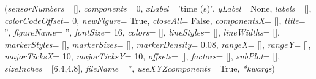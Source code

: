 \ei

%
\begin{flushleft}
\label{sec:mainsystemextensions:PlotSensor}
({\it sensorNumbers}= [], {\it components}= 0, {\it xLabel}= 'time (s)', {\it yLabel}= None, {\it labels}= [], {\it colorCodeOffset}= 0, {\it newFigure}= True, {\it closeAll}= False, {\it componentsX}= [], {\it title}= '', {\it figureName}= '', {\it fontSize}= 16, {\it colors}= [], {\it lineStyles}= [], {\it lineWidths}= [], {\it markerStyles}= [], {\it markerSizes}= [], {\it markerDensity}= 0.08, {\it rangeX}= [], {\it rangeY}= [], {\it majorTicksX}= 10, {\it majorTicksY}= 10, {\it offsets}= [], {\it factors}= [], {\it subPlot}= [], {\it sizeInches}= [6.4,4.8], {\it fileName}= '', {\it useXYZcomponents}= True, {\it **kwargs})
\end{flushleft}
\setlength{\itemindent}{0.7cm}
